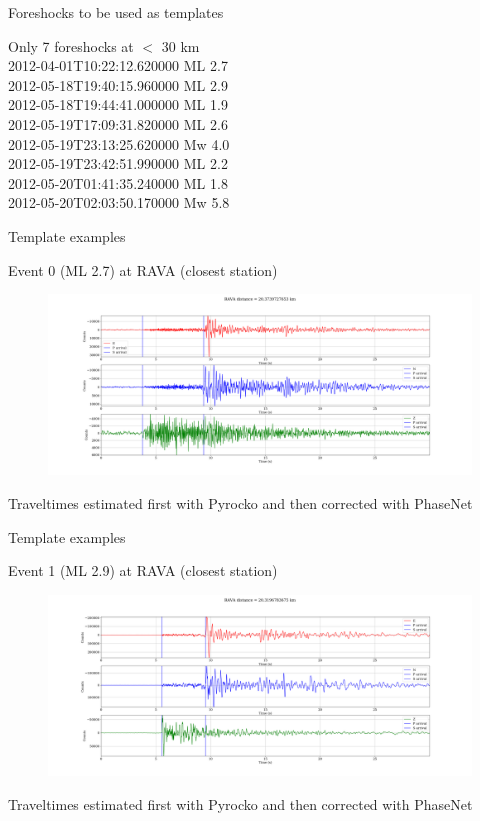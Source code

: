 \documentclass[aspectratio=43,9pt]{beamer}
\begin{document}
\begin{frame}{Foreshocks to be used as templates}

 \centering Only 7 foreshocks at $<$ 30 km \\
 \vskip 0.4cm
2012-04-01T10:22:12.620000 ML 2.7 \\
2012-05-18T19:40:15.960000 ML 2.9 \\
2012-05-18T19:44:41.000000 ML 1.9 \\
2012-05-19T17:09:31.820000 ML 2.6 \\
2012-05-19T23:13:25.620000 Mw 4.0 \\
2012-05-19T23:42:51.990000 ML 2.2 \\
2012-05-20T01:41:35.240000 ML 1.8 \\
\vskip 0.2cm
2012-05-20T02:03:50.170000 Mw 5.8 

\end{frame}


\begin{frame}{Template examples}

\centering Event 0 (ML 2.7) at RAVA (closest station)
\begin{figure}
 \includegraphics[width=1\linewidth]{figs/event_0_RAVA.png}
\end{figure}

Traveltimes estimated first with Pyrocko and then corrected with PhaseNet

\end{frame}


\begin{frame}{Template examples}

\centering Event 1 (ML 2.9) at RAVA (closest station)
\begin{figure}
 \includegraphics[width=1\linewidth]{figs/event_1_RAVA.png}
\end{figure}

Traveltimes estimated first with Pyrocko and then corrected with PhaseNet

\end{frame}
\end{document}
